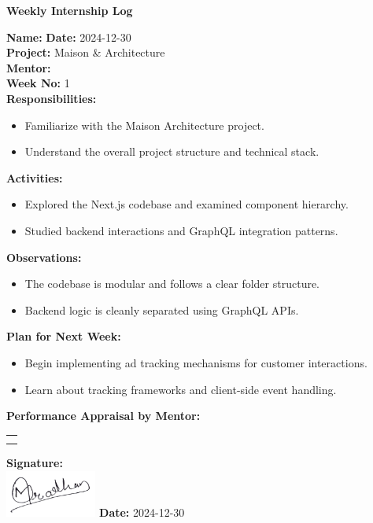 \begin{center}
    \bfseries Weekly Internship Log
\end{center}

\noindent
\textbf{Name:}  \hfill \textbf{Date:} 2024-12-30 \\
\textbf{Project:} Maison \& Architecture \hfill \\
\textbf{Mentor:}  \\
\textbf{Week No:} 1 \\

\noindent
\textbf{Responsibilities:}
\begin{itemize}
    \item Familiarize with the Maison Architecture project.
    \item Understand the overall project structure and technical stack.
\end{itemize}

\noindent
\textbf{Activities:}
\begin{itemize}
    \item Explored the Next.js codebase and examined component hierarchy.
    \item Studied backend interactions and GraphQL integration patterns.
\end{itemize}

\noindent
\textbf{Observations:}
\begin{itemize}
    \item The codebase is modular and follows a clear folder structure.
    \item Backend logic is cleanly separated using GraphQL APIs.
\end{itemize}

\noindent
\textbf{Plan for Next Week:}
\begin{itemize}
    \item Begin implementing ad tracking mechanisms for customer interactions.
    \item Learn about tracking frameworks and client-side event handling.
\end{itemize}

\noindent
\textbf{Performance Appraisal by Mentor:} \\
\begin{table}[h]
    \centering
    \noindent
    \begin{tabularx}{\textwidth} { 
        | >{\centering\arraybackslash}X| }

        \hline
        \\ \\
        \hline
    \end{tabularx}
\end{table}

\vfill
\noindent
\textbf{Signature:} \\
\includegraphics[width=3cm]{assets/nirajpradhan-sign.png} \hfill \textbf{Date:} 2024-12-30
